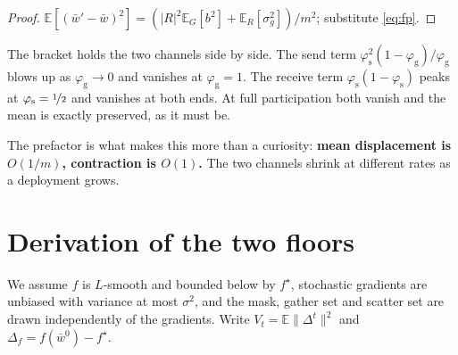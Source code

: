 \documentclass{article}
\theoremstyle{plain}
\newcommand{\sg}{\sigma_g}
\newcommand{\pg}{\varphi_{\mathrm{g}}}
\newcommand{\ps}{\varphi_{\mathrm{s}}}
\newcommand{\E}{\mathbb{E}}
\begin{document}
\begin{proof}
$\E[(\bar w'-\bar w)^2] = (|R|^2\E_G[b^2] + \E_R[\sg^2])/m^2$; substitute
\eqref{eq:fp}.
\end{proof}

The bracket holds the two channels side by side. The send term
$\ps^2(1-\pg)/\pg$ blows up as $\pg\to0$ and vanishes at $\pg = 1$. The
receive term $\ps(1-\ps)$ peaks at $\ps = \nicefrac12$ and vanishes at both
ends. At full participation both vanish and the mean is exactly preserved, as
it must be.

The prefactor is what makes this more than a curiosity: \textbf{mean
displacement is $O(1/m)$, contraction is $O(1)$.} The two channels shrink at
different rates as a deployment grows.


\section{Derivation of the two floors}\label{app:floors}

We assume $f$ is $L$-smooth and bounded below by $f^\star$, stochastic
gradients are unbiased with variance at most $\sigma^2$, and the mask, gather
set and scatter set are drawn independently of the gradients. Write
$V_t = \E\|\Delta^t\|^2$ and $\Delta_f = f(\bar w^0) - f^\star$.
\end{document}
